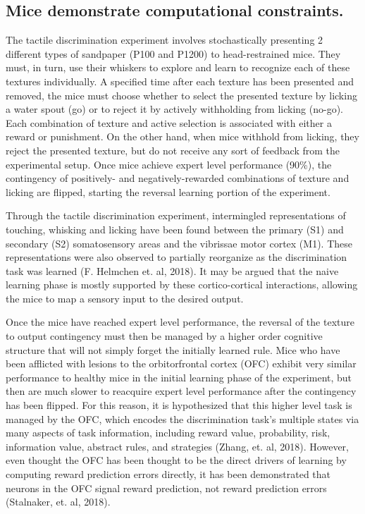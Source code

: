\documentclass[11pt]{article}
\begin{document}
\subsection{Mice demonstrate computational constraints.}

The tactile discrimination experiment involves stochastically presenting 2 different types of sandpaper (P100 and P1200) to head-restrained mice.  They must, in turn, use their whiskers to explore and learn to recognize each of these textures individually.  A specified time after each texture has been presented and removed, the mice must choose whether to select the presented texture by  licking a water spout (go) or to reject it by actively withholding from licking (no-go).  Each combination of texture and active selection is associated with either a reward or punishment.  On the other hand, when mice withhold from licking, they reject the presented texture, but do not receive any sort of feedback from the experimental setup.  Once mice achieve expert level performance (90\%), the contingency of positively- and negatively-rewarded combinations of texture and licking are flipped, starting the reversal learning portion of the experiment.

Through the tactile discrimination experiment, intermingled representations of touching, whisking and licking have been found between the primary (S1) and secondary (S2) somatosensory areas and the vibrissae motor cortex (M1).  These representations were also observed to partially reorganize as the discrimination task was learned (F. Helmchen et. al, 2018).  It may be argued that the naive learning phase is mostly supported by these cortico-cortical interactions, allowing the mice to map a sensory input to the desired output.

Once the mice have reached expert level performance, the reversal of the texture to output contingency must then be managed by a higher order cognitive structure that will not simply forget the initially learned rule.  Mice who have been afflicted with lesions to the orbitorfrontal cortex (OFC) exhibit very similar performance to healthy mice in the initial learning phase of the experiment, but then are much slower to reacquire expert level performance after the contingency has been flipped.  For this reason, it is hypothesized that this higher level task is managed by the OFC, which encodes the discrimination task's multiple states via many aspects of task information, including reward value, probability, risk, information value, abstract rules, and strategies (Zhang, et. al, 2018).  However, even thought the OFC has been thought to be the direct drivers of learning by computing reward prediction errors directly, it has been demonstrated that neurons in the OFC signal reward prediction, not reward prediction errors (Stalnaker, et. al, 2018).
\end{document}
